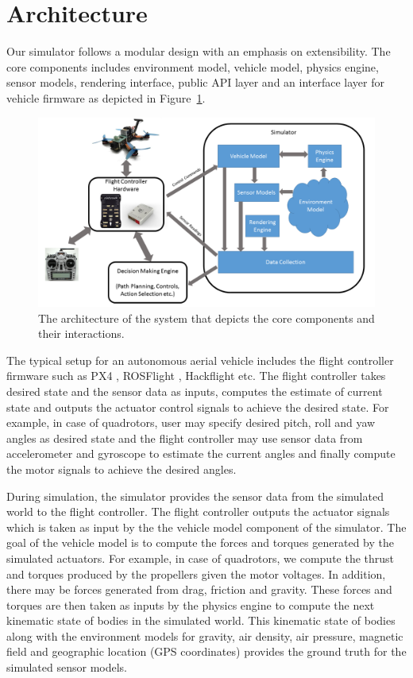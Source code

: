 \documentclass[graybox]{svmult}
\begin{document}
\section{Architecture}
Our simulator follows a modular design with an emphasis on extensibility. The core components includes environment model, vehicle model, physics engine, sensor models, rendering interface, public API layer and an interface layer for vehicle firmware as depicted in Figure~\ref{fig:arch}.

\begin{figure}[ttbp]
\includegraphics[width=\textwidth]{overview.PNG}
\caption{The architecture of the system that depicts the core components and their interactions.}
\label{fig:arch}
\end{figure}

The typical setup for an autonomous aerial vehicle includes the flight controller firmware such as PX4 \cite{meier2011pixhawk}, ROSFlight \cite{jackson2016rosflight}, Hackflight\cite{levyHackflight} etc. The flight controller takes desired state and the sensor data as inputs, computes the estimate of current state and outputs the actuator control signals to achieve the desired state. For example, in case of quadrotors, user may specify desired pitch, roll and yaw angles as desired state and the flight controller may use sensor data from accelerometer and gyroscope to estimate the current angles and finally compute the motor signals to achieve the desired angles.

During simulation, the simulator provides the sensor data from the simulated world to the flight controller. The flight controller outputs the actuator signals which is taken as input by the the vehicle model component of the simulator. The goal of the vehicle model is to compute the forces and torques generated by the simulated actuators. For example, in case of quadrotors, we compute the thrust and torques produced by the propellers given the motor voltages. In addition, there may be forces generated from drag, friction and gravity. These forces and torques are then taken as inputs by the physics engine to compute the next kinematic state of bodies in the simulated world. This kinematic state of bodies along with the environment models for gravity, air density, air pressure, magnetic field and geographic location (GPS coordinates) provides the ground truth for the simulated sensor models.
\end{document}
